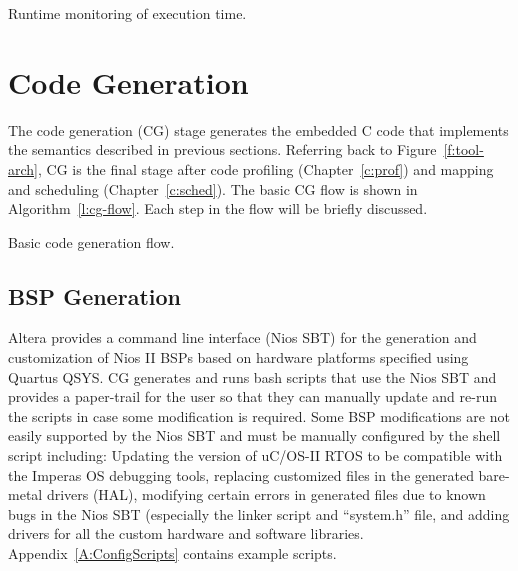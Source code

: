 \begin{algorithm}
	\caption{Runtime monitoring of execution time.}
	\label{a:run-mon}
\end{algorithm}


\section{Code Generation}
\label{s:codegen}

	The code generation (CG) stage generates the embedded C code that implements the semantics described in previous sections. 
	Referring back to Figure~\ref{f:tool-arch}, CG is the final stage after code profiling (Chapter~\ref{c:prof}) and mapping and scheduling (Chapter~\ref{c:sched}).  
	The basic CG flow is shown in Algorithm~\ref{l:cg-flow}. 
	Each step in the flow will be briefly discussed.

\begin{algorithm}

\caption{Basic code generation flow.}
\label{l:cg-flow}
\end{algorithm}


\subsection{BSP Generation}
	Altera provides a command line interface (Nios SBT) for the generation and customization of Nios II BSPs based on hardware platforms specified using Quartus QSYS. 
	CG generates and runs bash scripts that use the Nios SBT and provides a paper-trail for the user so that they can manually update and re-run the scripts in case some modification is required.
	Some BSP modifications are not easily supported by the Nios SBT and must be manually configured by the shell script including: Updating the version of uC/OS-II RTOS to be compatible with the Imperas OS debugging tools, replacing customized files in the generated bare-metal drivers (HAL), modifying certain errors in generated files due to known bugs in the Nios SBT (especially the linker script and ``system.h'' file, and adding drivers for all the custom hardware and software libraries. Appendix~\ref{A:ConfigScripts} contains example scripts.

